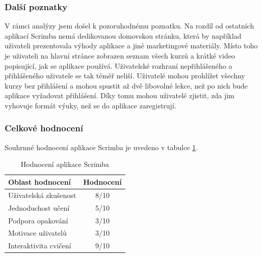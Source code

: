 \subsubsection{Další poznatky}

V rámci analýzy jsem došel k pozoruhodnému poznatku. Na rozdíl od ostatních aplikací Scrimba nemá dedikovanou domovskou stránku, která by například uživateli prezentovala výhody aplikace a jiné marketingové materiály. Místo toho je uživateli na hlavní stránce zobrazen seznam všech kurzů a krátké video popisující, jak se aplikace používá. Uživatelské rozhraní nepřihlášeného a přihlášeného uživatele se tak téměř neliší. Uživatelé mohou prohlížet všechny kurzy bez přihlášení a mohou spustit až dvě libovolné lekce, než po nich bude aplikace vyžadovat přihlášení. Díky tomu mohou uživatelé zjistit, zda jim vyhovuje formát výuky, než se do aplikace zaregistrují.

\subsubsection{Celkové hodnocení}

Souhrnné hodnocení aplikace Scrimba je uvedeno v tabulce \ref{table:competitor-rating-scrimba}.

\begin{table}[ht]
    \centering
    \begin{tabular}{@{} l c @{}}
        \toprule
        Oblast hodnocení & Hodnocení \\
        \midrule
        Uživatelská zkušenost & 8/10 \\
        Jednoduchost učení & 5/10 \\
        Podpora opakování & 3/10 \\
        Motivace uživatelů & 3/10 \\
        Interaktivita cvičení & 9/10 \\
        \bottomrule
    \end{tabular}
    \captionsetup{justification=centering}
    \caption{Hodnocení aplikace Scrimba}
    \label{table:competitor-rating-scrimba}
\end{table}
